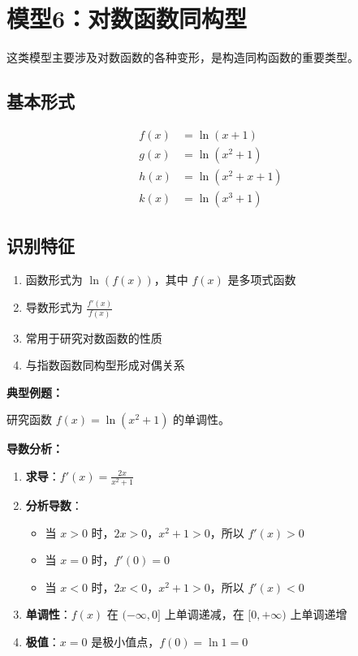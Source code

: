 \documentclass[a4paper,11pt]{ctexrep}
\newcommand{\exampleicon}{\ModeBadge[highlight]{例题}}
\newcommand{\analysisicon}{\ModeBadge[secondary]{分析}}
\theoremstyle{definition}
\begin{document}
\section{模型6：对数函数同构型}

这类模型主要涉及对数函数的各种变形，是构造同构函数的重要类型。

\subsection{基本形式}

\begin{definitionbox}[对数函数同构型]
\begin{align}
f(x) &= \ln(x+1) \\
g(x) &= \ln(x^2+1) \\
h(x) &= \ln(x^2+x+1) \\
k(x) &= \ln(x^3+1)
\end{align}
\end{definitionbox}

\subsection{识别特征}

\begin{tipbox}[对数函数同构型识别要点]
\begin{enumerate}
    \item 函数形式为 $\ln(f(x))$，其中 $f(x)$ 是多项式函数
    \item 导数形式为 $\frac{f'(x)}{f(x)}$
    \item 常用于研究对数函数的性质
    \item 与指数函数同构型形成对偶关系
\end{enumerate}
\end{tipbox}

\exampleicon \textbf{典型例题：}

研究函数 $f(x) = \ln(x^2+1)$ 的单调性。

\analysisicon \textbf{导数分析：}

\begin{enumerate}
    \item \textbf{求导}：$f'(x) = \frac{2x}{x^2+1}$
    \item \textbf{分析导数}：
    \begin{itemize}
        \item 当 $x > 0$ 时，$2x > 0$，$x^2+1 > 0$，所以 $f'(x) > 0$
        \item 当 $x = 0$ 时，$f'(0) = 0$
        \item 当 $x < 0$ 时，$2x < 0$，$x^2+1 > 0$，所以 $f'(x) < 0$
    \end{itemize}
    \item \textbf{单调性}：$f(x)$ 在 $(-\infty, 0]$ 上单调递减，在 $[0, +\infty)$ 上单调递增
    \item \textbf{极值}：$x = 0$ 是极小值点，$f(0) = \ln 1 = 0$
\end{enumerate}
\end{document}

